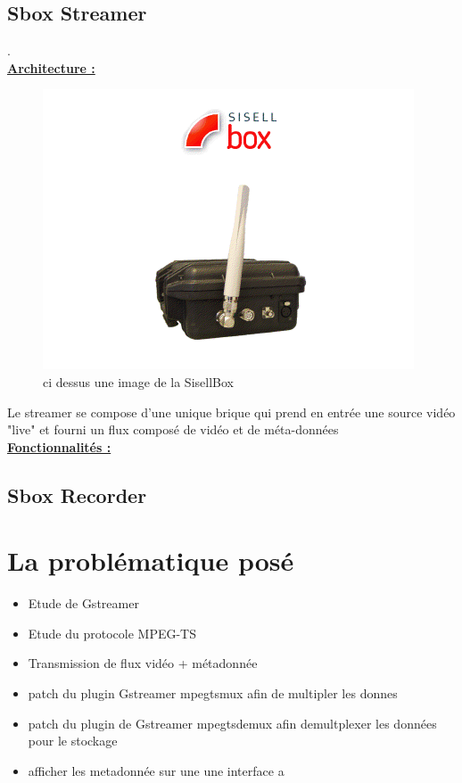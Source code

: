 \section{Sbox Streamer}
.\\
\textbf{\underline{Architecture :}}

\begin{figure}[!h]
  \centering
  \includegraphics{figures/sbox}
  \caption{ci dessus une image de la SisellBox}
\end{figure}

Le streamer se compose d'une unique brique qui prend en entrée une source vidéo
"live" et fourni un flux composé de vidéo et de méta-données
\\
\textbf{\underline{Fonctionnalités :}}\\


\section{Sbox Recorder}
 

\chapter{La problématique posé}
\begin{itemize}
  \item Etude de Gstreamer
  \item Etude du protocole MPEG-TS
  \item Transmission de flux vidéo + métadonnée
  \item patch du plugin Gstreamer mpegtsmux afin de  multipler les donnes
  \item patch du plugin de Gstreamer mpegtsdemux afin demultplexer les données pour le stockage
  \item afficher les metadonnée sur une une interface a
\end{itemize}
